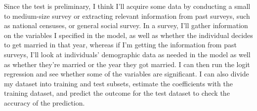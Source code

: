 \documentclass[11pt, oneside]{article}
\begin{document}
\begin{enumerate}
\begin{enumerate} [label=(\alph*)]
Since the test is preliminary, I think I'll acquire some data by conducting a small to medium-size survey or extracting relevant information from past surveys, such as national censuses, or general social survey. In a survey, I'll gather information on the variables I specified in the model, as well as whether the individual decides to get married in that year, whereas if I'm getting the information from past surveys, I'll look at individuals' demographic data as needed in the model as well as whether they're married or the year they got married. I can then run the logit regression and see whether some of the variables are significant. I can also divide my dataset into training and test subsets, estimate the coefficients with the training dataset, and predict the outcome for the test dataset to check the accuracy of the prediction. 

\end{enumerate}
\end{enumerate}
\end{document}

